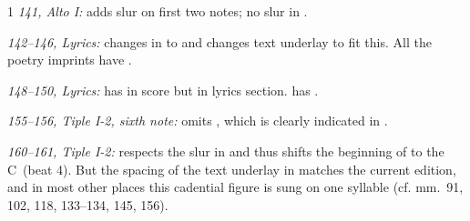 \begin{hangparas}{\myparindent}{1}
\emph{141, Alto I: }
 adds slur on first two notes; no slur in .

\emph{142--146, Lyrics: }
 changes  in  to  and changes text underlay to fit this. 
All the poetry imprints have .

\emph{148--150, Lyrics: }
 has  in score but  in lyrics section.  has .

\emph{155--156, Tiple I-2, sixth note: }
 omits , which is clearly indicated in .

\emph{160--161, Tiple I-2: }
 respects the slur in  and thus shifts the beginning of  to the C\sh\ (beat 4). 
But the spacing of the text underlay in  matches the current edition, and in most other places this cadential figure is sung on one syllable (cf. mm.~91, 102, 118, 133--134, 145, 156).
%
\end{hangparas}
